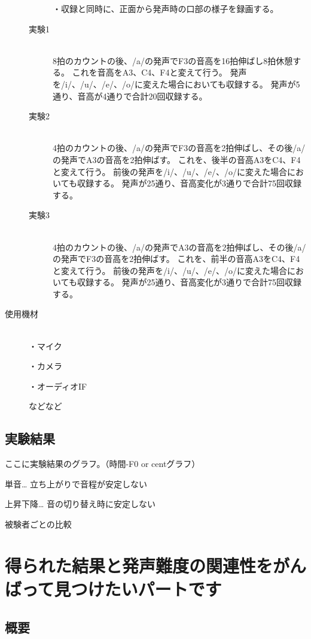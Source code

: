 \documentclass[10ptj,a4j,dvipdfmx,uplatex]{jsbook}
\begin{document}
\begin{description}
\begin{description}
                ・収録と同時に、正面から発声時の口部の様子を録画する。
            \item[実験1]\mbox{}\\
                8拍のカウントの後、/a/の発声でF3の音高を16拍伸ばし8拍休憩する。
                これを音高をA3、C4、F4と変えて行う。
                発声を/i/、/u/、/e/、/o/に変えた場合においても収録する。
                発声が5通り、音高が4通りで合計20回収録する。
            \item[実験2]\mbox{}\\
                4拍のカウントの後、/a/の発声でF3の音高を2拍伸ばし、その後/a/の発声でA3の音高を2拍伸ばす。
                これを、後半の音高A3をC4、F4と変えて行う。
                前後の発声を/i/、/u/、/e/、/o/に変えた場合においても収録する。
                発声が25通り、音高変化が3通りで合計75回収録する。
            \item[実験3]\mbox{}\\
                4拍のカウントの後、/a/の発声でA3の音高を2拍伸ばし、その後/a/の発声でF3の音高を2拍伸ばす。
                これを、前半の音高A3をC4、F4と変えて行う。
                前後の発声を/i/、/u/、/e/、/o/に変えた場合においても収録する。
                発声が25通り、音高変化が3通りで合計75回収録する。
        \end{description}

    \item[使用機材]\mbox{}\\
        ・マイク

        ・カメラ

        ・オーディオIF

        などなど
\end{description}

\subsection{実験結果}
ここに実験結果のグラフ。（時間-F0 or centグラフ）

単音…
立ち上がりで音程が安定しない

上昇下降…
音の切り替え時に安定しない

被験者ごとの比較

\section{得られた結果と発声難度の関連性をがんばって見つけたいパートです}
\subsection{概要}
\end{document}

